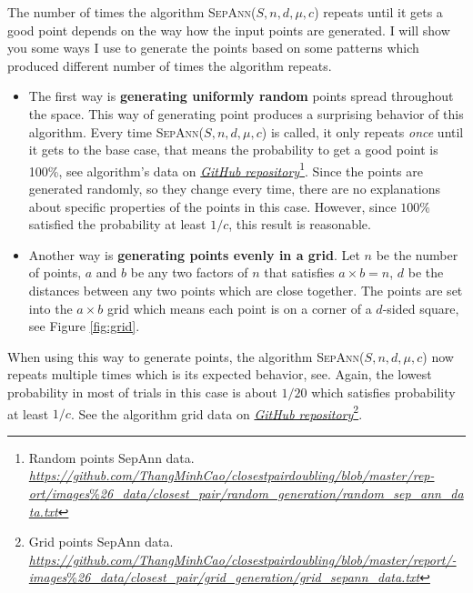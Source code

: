 \documentclass[12pt,english,]{article}
\begin{document}
The number of times the algorithm \textsc{SepAnn($S,n,d,\mu,c$)} repeats
until it gets a good point depends on the way how the input points are
generated. I will show you some ways I use to generate the points based
on some patterns which produced different number of times the algorithm
repeats.

\begin{itemize}
\item
  The first way is \textbf{generating uniformly random} points spread
  throughout the space. This way of generating point produces a
  surprising behavior of this algorithm. Every time
  \textsc{SepAnn($S,n,d,\mu,c$)} is called, it only repeats \emph{once}
  until it gets to the base case, that means the probability to get a
  good point is 100\%, see algorithm's data on
  \href{https://github.com/ThangMinhCao/closestpairdoubling/blob/master/report/Images/closest_pair/random_generation/random_sep_ann_data.txt}{\emph{GitHub
  repository}}\footnote{Random points SepAnn data.
    \href{https://github.com/ThangMinhCao/closestpairdoubling/blob/master/report/images_\%26_data/closest_pair/random_generation/random_sep_ann_data.txt}{\emph{https://github.com/ThangMinhCao/closestpairdoubling/blob/master/rep-
    ort/images}\%\emph{26\_data/closest\_pair/random\_generation/random\_sep\_ann\_data.txt}}}.
  Since the points are generated randomly, so they change every time,
  there are no explanations about specific properties of the points in
  this case. However, since \(100\%\) satisfied the probability at least
  \(1/c\), this result is reasonable.
\item
  Another way is \textbf{generating points evenly in a grid}. Let \(n\)
  be the number of points, \(a\) and \(b\) be any two factors of \(n\)
  that satisfies \(a\times b = n\), \(d\) be the distances between any
  two points which are close together. The points are set into the
  \(a \times b\) grid which means each point is on a corner of a
  \(d\)-sided square, see Figure \ref{fig:grid}.
\end{itemize}

When using this way to generate points, the algorithm
\textsc{SepAnn($S,n,d,\mu,c$)} now repeats multiple times which is its
expected behavior, see. Again, the lowest probability in most of trials
in this case is about \(1/20\) which satisfies probability at least
\(1/c\). See the algorithm grid data on
\href{https://github.com/ThangMinhCao/closestpairdoubling/blob/master/report/images_\%26_data/closest_pair/grid_generation/grid_sepann_data.txt}{\emph{GitHub
repository}}\footnote{Grid points SepAnn data.
  \href{https://github.com/ThangMinhCao/closestpairdoubling/blob/master/report/images_\%26_data/closest_pair/grid_generation/grid_sepann_data.txt}{\emph{https://github.com/ThangMinhCao/closestpairdoubling/blob/master/report/-}
  \emph{images}\%\emph{26\_data/closest\_pair/grid\_generation/grid\_sepann\_data.txt}}}.
\end{document}
